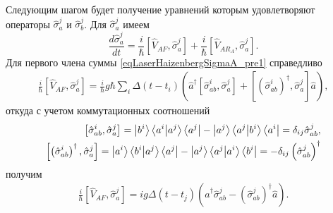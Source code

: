 Следующим шагом будет получение уравнений которым удовлетворяют
операторы $\hat{\sigma}_a^j$ и $\hat{\sigma}_b^j$. Для
$\hat{\sigma}_a^j$ имеем
\begin{equation}
\frac{d \hat{\sigma}_a^j}{d t} = 
\frac{i}{\hbar}
\left[\hat{V}_{AF}, \hat{\sigma}_a^j\right] + 
\frac{i}{\hbar}
\left[\hat{V}_{AR_A}, \hat{\sigma}_a^j\right].
\label{eqLaserHaizenbergSigmaA_pre1}
\end{equation}
Для первого члена суммы \eqref{eqLaserHaizenbergSigmaA_pre1} справедливо
\begin{eqnarray}
\frac{i}{\hbar}
\left[\hat{V}_{AF}, \hat{\sigma}_a^j\right] = 
 \frac{i}{\hbar} g \hbar
\sum_i
\Delta\left(t - t_i\right) 
 \left(
\hat{a}^{\dag}\left[\hat{\sigma}^{i}_{ab},\hat{\sigma}_a^j\right]  +
\left[\left(\hat{\sigma}^{i}_{ab}\right)^{\dag},\hat{\sigma}_a^j\right]
\hat{a}
\right),
\nonumber
\end{eqnarray}
откуда с учетом коммутационных соотношений 
\begin{eqnarray}
\left[\hat{\sigma}^{i}_{ab},\hat{\sigma}_a^j\right] = 
\ket{b^i}\bra{a^i}\ket{a^j}\bra{a^j} -
\ket{a^j}\bra{a^j}\ket{b^i}\bra{a^i} = 
\delta_{ij}\hat{\sigma}^{j}_{ab},
\nonumber \\
\left[\left(\hat{\sigma}^{i}_{ab}\right)^{\dag},\hat{\sigma}_a^j\right] = 
\ket{a^i}\bra{b^i}\ket{a^j}\bra{a^j} -
\ket{a^j}\bra{a^j}\ket{a^i}\bra{b^i} = 
- \delta_{ij}\left(\hat{\sigma}^{j}_{ab}\right)^{\dag}
\nonumber
\end{eqnarray}
получим
\begin{eqnarray}
\frac{i}{\hbar}
\left[\hat{V}_{AF}, \hat{\sigma}_a^j\right] = 
i g 
\Delta\left(t - t_j\right) 
 \left(
\hat{a}^{\dag}\hat{\sigma}^{j}_{ab} -
\left(\hat{\sigma}^{j}_{ab}\right)^{\dag}\hat{a}
\right).
\label{eqLaserHaizenbergSigmaA_pre1_1}
\end{eqnarray}

